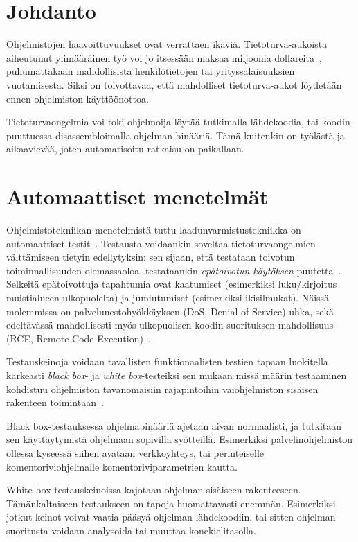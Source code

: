 \section{Johdanto}

Ohjelmistojen haavoittuvuukset ovat verrattaen ikäviä.
Tietoturva-aukoista aiheutunut ylimääräinen työ voi jo itsessään maksaa miljoonia dollareita~\cite{SageArtikkeli}, 
puhumattakaan mahdollisista henkilötietojen tai yrityssalaisuuksien vuotamisesta.
Siksi on toivottavaa, että mahdolliset tietoturva-aukot löydetään ennen ohjelmiston käyttöönottoa.

Tietoturvaongelmia voi toki ohjelmoija löytää tutkimalla lähdekoodia,
tai koodin puuttuessa disassembloimalla ohjelman binääriä. \fixme
Tämä kuitenkin on työlästä ja aikaavievää, joten automatisoitu ratkaisu on paikallaan.

\section{Automaattiset menetelmät}

Ohjelmistotekniikan menetelmistä tuttu laadunvarmistustekniikka on automaattiset testit~\cite{Sommerville}.
Testausta voidaankin soveltaa tietoturvaongelmien välttämiseen tietyin edellytyksin:
sen sijaan, että testataan toivotun toiminnallisuuden olemassaoloa,
testataankin \emph{epätoivotun käytöksen} puutetta~\cite{OuluBrowser}.
Selkeitä epätoivottuja tapahtumia ovat kaatumiset (esimerkiksi luku/kirjoitus muistialueen ulkopuolelta) ja jumiutumiset (esimerkiksi ikisilmukat).
Näissä molemmissa on palvelunestohyökkäyksen (DoS, Denial of Service) uhka,
sekä edeltävässä mahdollisesti myös ulkopuolisen koodin suorituksen mahdollisuus (RCE, Remote Code Execution)~\cite{JokuLahdeTahan}. \fixme

Testauskeinoja voidaan tavallisten funktionaalisten testien tapaan luokitella karkeasti \emph{black box}- ja \emph{white box}-testeiksi  sen mukaan missä määrin
testaaminen kohdistuu ohjelmiston tavanomaisiin rajapintoihin vai\fixme ohjelmiston sisäisen rakenteen toimintaan~\cite{Sommerville}.

Black box-testauksessa \fixme[käännökset?] ohjelmabinääriä ajetaan aivan normaalisti,
ja tutkitaan sen käyttäytymistä ohjelmaan sopivilla syötteillä.
Esimerkiksi palvelinohjelmiston ollessa kyseessä siihen avataan verkkoyhteys,
tai perinteiselle komentoriviohjelmalle komentoriviparametrien kautta.

White box-testauskeinoissa kajotaan ohjelman sisäiseen rakenteeseen.
Tämänkaltaiseen testaukseen on tapoja huomattavasti enemmän.
Esimerkiksi jotkut keinot voivat vaatia pääsyä ohjelman lähdekoodiin,
tai sitten ohjelman suoritusta voidaan analysoida tai muuttaa konekielitasolla.


